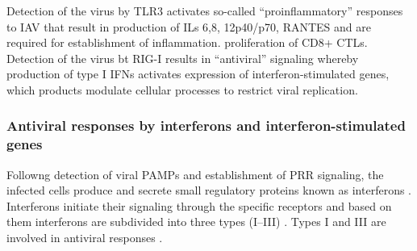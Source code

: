 		
	
		Detection of the virus by TLR3 activates so-called ``proinflammatory'' responses\parencite{LeGoffic2007} to IAV that result in production of ILs 6,8, 12p40/p70, RANTES and are required for establishment of inflammation. proliferation of CD8+ CTLs. Detection of the virus bt RIG-I results in ``antiviral'' signaling \parencite{LeGoffic2007} whereby production of type I IFNs activates expression of interferon-stimulated genes, which products modulate cellular processes to restrict viral replication.
		
		\subsubsection{Antiviral responses by interferons and interferon-stimulated genes}
		
		Followng detection of viral \gls{PAMP}s and establishment of \gls{PRR} signaling, the infected cells produce and secrete small regulatory proteins known as interferons \parencite{Fensterl2009}. Interferons initiate their signaling through the specific receptors and based on them interferons are subdivided into three types (I--III) \parencite{Branca1981, Sheppard2003}. Types I and III are involved in antiviral responses \parencite{Kotenko2003, Garcia-Sastre2006}.
		

